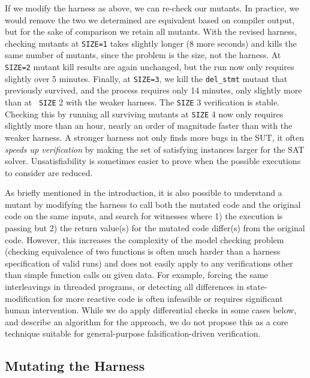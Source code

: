 \documentclass[conference]{IEEEtran}
\begin{document}
If we modify the harness as above, we can re-check our mutants.  In
practice, we would remove the two we determined are equivalent based
on compiler output, but for the sake of comparison we retain all
mutants.  With the revised harness, checking mutants at {\tt SIZE=1}
takes slightly longer (8 more seconds) and kills the same number of
mutants, since the problem is the size, not the harness.  At {\tt
  SIZE=2} mutant kill results are again unchanged, but the run now
only requires slightly over 5 minutes.  Finally, at {\tt SIZE=3}, we
kill the {\tt del\_stmt} mutant that previously survived, and the
process requires only 14 minutes, only slightly more than at {\tt
  SIZE} 2 with the weaker harness.  The {\tt SIZE} 3 verification is
stable.  Checking this by running all surviving mutants at {\tt SIZE}
4 now only requires slightly more than an hour, nearly an order of
magnitude faster than with the weaker harness.  A stronger harness not
only finds more bugs in the SUT, it often \emph{speeds up
  verification} by making the set of satisfying instances larger for
the SAT solver.  Unsatisfiability  is sometimes easier to prove when the possible
executions to consider are reduced.

As briefly mentioned in the introduction, it is also possible to
understand a mutant by modifying the harness to call both the mutated
code and the original code on the same inputs, and search for
witnesses where 1) the execution is passing but 2) the return value(s)
for the mutated code differ(s) from the original code.  However, this
increases the complexity of the model checking problem (checking
equivalence of two functions is often much harder than a harness
specification of valid runs) and does not easily apply to any verifications other
than simple function calls on given data.  For example, forcing the
same interleavings in threaded programs, or detecting all
differences in state-modification for more reactive code is often
infeasible or requires significant human intervention.  While we do
apply differential checks in some cases below, and describe an
algorithm for the approach, we do not propose this as a core technique
suitable for general-purpose falsification-driven verification.

\subsection{Mutating the Harness}
\label{sec:checkharness}
\end{document}

